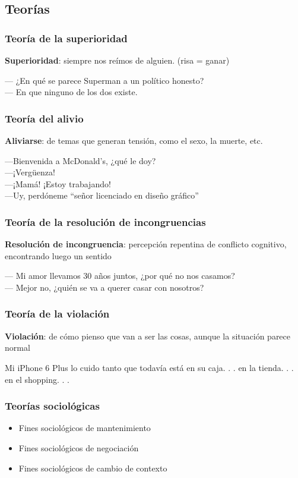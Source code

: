\subsection{Teorías}
\begin{frame}
    \frametitle{Teoría de la superioridad}

    \textbf{Superioridad}: siempre nos reímos de alguien. (risa = ganar)
    \begin{example}
        — ¿En qué se parece Superman a un político honesto? \\
        — En que ninguno de los dos existe.
    \end{example}
\end{frame}

\begin{frame}
\frametitle{Teoría del alivio}
    \textbf{Aliviarse}: de temas que generan tensión, como el sexo, la muerte, etc.
    \begin{example}
        —Bienvenida a McDonald’s, ¿qué le doy?\\
        —¡Vergüenza!\\
        —¡Mamá! ¡Estoy trabajando!\\
        —Uy, perdóneme ``señor licenciado en diseño gráfico''\\
    \end{example}
\end{frame}

\begin{frame}
\frametitle{Teoría de la resolución de incongruencias}
    \textbf{Resolución de incongruencia}: percepción repentina de conflicto cognitivo, encontrando luego un sentido
    \begin{example}
        — Mi amor llevamos 30 años juntos, ¿por qué no nos casamos?\\
        — Mejor no, ¿quién se va a querer casar con nosotros?
    \end{example}
\end{frame}

\begin{frame}
\frametitle{Teoría de la violación}
    \textbf{Violación}: de cómo pienso que van a ser las cosas, aunque la situación parece normal
    \begin{example}
        Mi iPhone 6 Plus lo cuido tanto que todavía está en su caja. . . en la tienda. . . en el shopping. . .
    \end{example}
\end{frame}

\begin{frame}
\frametitle{Teorías sociológicas}
    \begin{itemize}
        \item Fines sociológicos de mantenimiento
        \item Fines sociológicos de negociación
        \item Fines sociológicos de cambio de contexto
    \end{itemize}
\end{frame}

